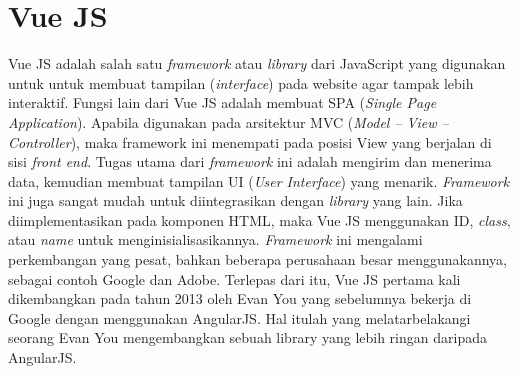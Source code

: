 \section{Vue JS}
Vue JS adalah salah satu \textit{framework} atau \textit{library} dari JavaScript yang digunakan untuk untuk membuat tampilan (\textit{interface}) pada website agar tampak lebih interaktif.
Fungsi lain dari Vue JS adalah membuat SPA (\textit{Single Page Application}). Apabila digunakan pada arsitektur MVC (\textit{Model – View – Controller}), maka framework ini menempati pada posisi View yang berjalan di sisi \textit{front end}.
Tugas utama dari \textit{framework} ini adalah mengirim dan menerima data, kemudian membuat tampilan UI (\textit{User Interface}) yang menarik. \textit{Framework} ini juga sangat mudah untuk diintegrasikan dengan \textit{library} yang lain.
Jika diimplementasikan pada komponen HTML, maka Vue JS menggunakan ID, \textit{class}, atau \textit{name} untuk menginisialisasikannya.
\textit{Framework} ini mengalami perkembangan yang pesat, bahkan beberapa perusahaan besar menggunakannya, sebagai contoh Google dan Adobe. Terlepas dari itu, Vue JS pertama kali dikembangkan pada tahun 2013 oleh Evan You yang sebelumnya bekerja di Google dengan menggunakan AngularJS.
Hal itulah yang melatarbelakangi seorang Evan You mengembangkan sebuah library yang lebih ringan daripada AngularJS.

